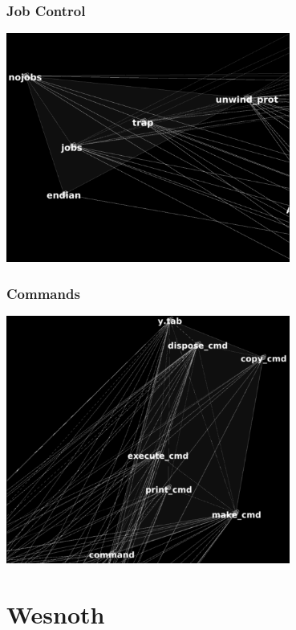 \documentclass{../cscslides}
\begin{document}
    \begin{frame}
        \frametitle{Job Control}
        \begin{center}
            \includegraphics[width=0.7\textwidth]{bashJobControlBlack.png}
        \end{center}
    \end{frame}

    \begin{frame}
        \frametitle{Commands}
        \begin{center}
            \includegraphics[width=0.7\textwidth]{bashCommandsBlack.png}
        \end{center}
    \end{frame}

    \section{Wesnoth}
\end{document}
